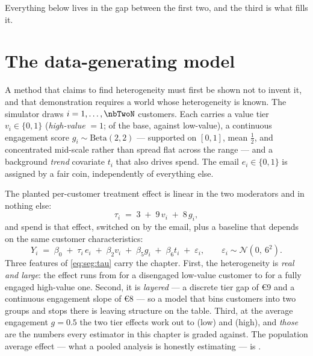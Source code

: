 Everything below lives in the gap between the first two, and the third is what fills it.

\section{The data-generating model}
\label{sec:seg:dgm}

A method that claims to find heterogeneity must first be shown not to invent it, and that
demonstration requires a world whose heterogeneity is known. The simulator draws
$i = 1, \dots, \nbTwoN$ customers. Each carries a value tier $v_i \in \{0, 1\}$ (\emph{high-value}
$= 1$; \nbTwoNHigh{} of the base, against \nbTwoNLow{} low-value), a continuous engagement score
$g_i \sim \mathrm{Beta}(2,2)$ --- supported on $[0,1]$, mean $\tfrac12$, and concentrated mid-scale
rather than spread flat across the range --- and a background \emph{trend} covariate $t_i$ that also
drives spend. The email
$e_i \in \{0,1\}$ is assigned by a fair coin, independently of everything else.

The planted per-customer treatment effect is linear in the two moderators and in nothing else:
%
\begin{equation}
  \tau_i \;=\; 3 \;+\; 9\,v_i \;+\; 8\,g_i ,
  \label{eq:seg:tau}
\end{equation}
%
and spend is that effect, switched on by the email, plus a baseline that depends on the same
customer characteristics:
%
\begin{equation}
  Y_i \;=\; \beta_0 \;+\; \tau_i\, e_i \;+\; \beta_2 v_i \;+\; \beta_5 g_i \;+\; \beta_6 t_i
            \;+\; \varepsilon_i,
  \qquad \varepsilon_i \sim \mathcal N\!\left(0,\ 6^{2}\right).
  \label{eq:seg:dgp}
\end{equation}
%
Three features of \cref{eq:seg:tau} carry the chapter. First, the heterogeneity is \emph{real and
large}: the effect runs from \eur{\nbTwoTauMin} for a disengaged low-value customer to
\eur{\nbTwoTauMax} for a fully engaged high-value one. Second, it is \emph{layered} --- a discrete
tier gap of €9 and a continuous engagement slope of €8 --- so a model that bins customers into two
groups and stops there is leaving structure on the table. Third, at the average engagement
$g = 0.5$ the two tier effects work out to \eur{\nbTwoTrueLow} (low) and \eur{\nbTwoTrueHigh}
(high), and \emph{those} are the numbers every estimator in this chapter is graded against. The
population average effect --- what a pooled analysis is honestly estimating --- is
\eur{\nbTwoTrueAte}.

